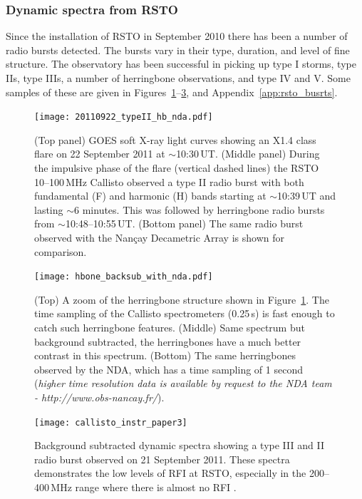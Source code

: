 \subsubsection{Dynamic spectra from RSTO}

Since the installation of RSTO in September 2010 there has been a number of radio bursts detected. The bursts vary in their type, duration, and level of fine structure. The observatory has been successful in picking up type I storms, type IIs, type IIIs, a number of herringbone observations, and type IV and V. Some samples of these are given in Figures~\ref{fig:typeII_hb}--\ref{fig:type_III}, and Appendix~\ref{app:rsto_busrts}.
\begin{figure}[!t]
\begin{center}
\texttt{[image: 20110922\_typeII\_hb\_nda.pdf]}
\caption[Callisto observations type II and herringbones]{ {\color{blue}(Top panel) GOES soft X-ray light curves showing an X1.4 class flare on 22 September 2011 at $\sim$10:30\,UT. (Middle panel) During the impulsive phase of the flare (vertical dashed lines) the RSTO 10--100\,MHz Callisto observed a type II radio burst with both fundamental (F) and harmonic (H) bands starting at $\sim$10:39\,UT and lasting $\sim$6 minutes. This was followed by herringbone radio bursts from $\sim$10:48--10:55\,UT. (Bottom panel) The same radio burst observed with the Nan\c{c}ay Decametric Array is shown for comparison.}}
\label{fig:typeII_hb}
\end{center}

\end{figure}
\begin{figure}[!t]
\begin{center}
\texttt{[image: hbone\_backsub\_with\_nda.pdf]}
\caption[Callisto observations type II and herringbones]{{\color{blue}(Top) A zoom of the herringbone structure shown in Figure~\ref{fig:typeII_hb}. The time sampling of the Callisto spectrometers (0.25\,s) is fast enough to catch such herringbone features. (Middle) Same spectrum but background subtracted, the herringbones have a much better contrast in this spectrum. (Bottom) The same herringbones observed by the NDA, which has a time sampling of 1 second (\emph{higher time resolution data is available by request to the NDA team - http://www.obs-nancay.fr/}).}}
\label{fig:herringbones}
\end{center}
\end{figure}
\begin{figure}[!t]
\begin{center}
\texttt{[image: callisto\_instr\_paper3]}
\caption[Callisto observations type II and herringbones]{Background subtracted dynamic spectra showing a type III and II radio burst observed on 21 September 2011. These spectra demonstrates the low levels of RFI at RSTO, especially in the 200--400\,MHz range where there is almost no RFI \citep{zucca2012}.}
\label{fig:type_III}
\end{center}
\end{figure}

